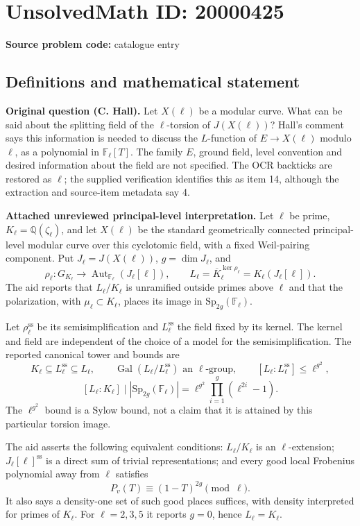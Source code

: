 \documentclass[11pt]{article}
\newcommand{\Q}{\mathbb{Q}}
\newcommand{\F}{\mathbb{F}}
\begin{document}
\section*{UnsolvedMath ID: 20000425}
\textbf{Source problem code:} catalogue entry
\subsection{Definitions and mathematical statement}
\textbf{Original question (C. Hall).} Let $X(\ell)$ be a modular curve. What can be said about the splitting field of the $\ell$-torsion of $J(X(\ell))$? Hall's comment says this information is needed to discuss the $L$-function of $E\to X(\ell)$ modulo $\ell$, as a polynomial in $\F_\ell[T]$. The family $E$, ground field, level convention and desired information about the field are not specified. The OCR backticks are restored as $\ell$; the supplied verification identifies this as item 14, although the extraction and source-item metadata say 4.

\textbf{Attached unreviewed principal-level interpretation.} Let $\ell$ be prime, $K_\ell=\Q(\zeta_\ell)$, and let $X(\ell)$ be the standard geometrically connected principal-level modular curve over this cyclotomic field, with a fixed Weil-pairing component. Put $J_\ell=J(X(\ell))$, $g=\dim J_\ell$, and
\[\rho_\ell:G_{K_\ell}\longrightarrow\operatorname{Aut}_{\F_\ell}(J_\ell[\ell]),\qquad L_\ell=\overline K_\ell^{\ker\rho_\ell}=K_\ell(J_\ell[\ell]).\]
The aid reports that $L_\ell/K_\ell$ is unramified outside primes above $\ell$ and that the polarization, with $\mu_\ell\subset K_\ell$, places its image in $\mathrm{Sp}_{2g}(\F_\ell)$.

Let $\rho_\ell^{\mathrm{ss}}$ be its semisimplification and $L_\ell^{\mathrm{ss}}$ the field fixed by its kernel. The kernel and field are independent of the choice of a model for the semisimplification. The reported canonical tower and bounds are
\[K_\ell\subseteq L_\ell^{\mathrm{ss}}\subseteq L_\ell,\qquad\operatorname{Gal}(L_\ell/L_\ell^{\mathrm{ss}})\text{ an }\ell\text{-group},\qquad [L_\ell:L_\ell^{\mathrm{ss}}]\le\ell^{g^2},\]
\[[L_\ell:K_\ell]\mid |\mathrm{Sp}_{2g}(\F_\ell)|=\ell^{g^2}\prod_{i=1}^g(\ell^{2i}-1).\]
The $\ell^{g^2}$ bound is a Sylow bound, not a claim that it is attained by this particular torsion image.

The aid asserts the following equivalent conditions: $L_\ell/K_\ell$ is an $\ell$-extension; $J_\ell[\ell]^{\mathrm{ss}}$ is a direct sum of trivial representations; and every good local Frobenius polynomial away from $\ell$ satisfies
\[P_v(T)\equiv(1-T)^{2g}\pmod\ell.\]
It also says a density-one set of such good places suffices, with density interpreted for primes of $K_\ell$. For $\ell=2,3,5$ it reports $g=0$, hence $L_\ell=K_\ell$.
\end{document}
